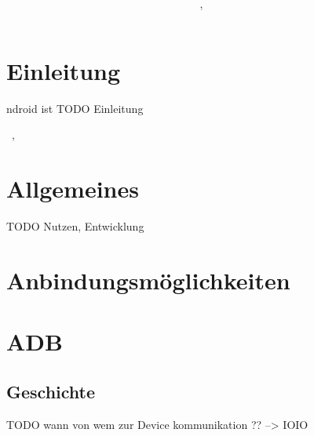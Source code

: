 \documentclass[12pt,journal,compsoc]{IEEEtran}
\begin{document}
\title{\paperTitle \\ \paperSubTitle }
\author{\paperAuthor,~}%




\maketitle

\section{Einleitung}


ndroid ist 
TODO Einleitung 






\hfill{\the\day~\Monat, \the\year  }

\section{Allgemeines}
TODO Nutzen, Entwicklung

\section{Anbindungsmöglichkeiten}


\section{ADB}
\subsection{Geschichte}

TODO wann von wem zur Device kommunikation ?? --> IOIO
\end{document}

